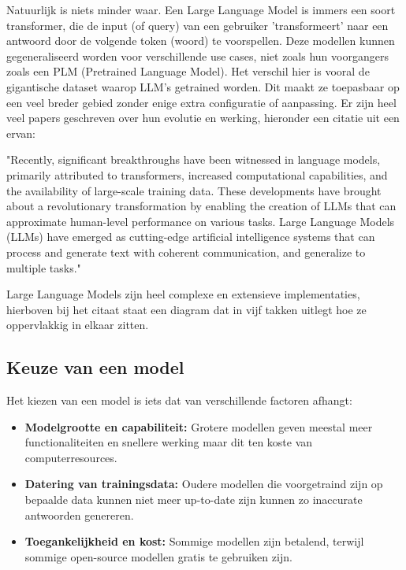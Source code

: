 Natuurlijk is niets minder waar.
Een Large Language Model is immers een soort transformer, die de input (of query) van een gebruiker 'transformeert' naar een antwoord door de volgende token (woord) te voorspellen.
Deze modellen kunnen gegeneraliseerd worden voor verschillende use cases, niet zoals hun voorgangers zoals een PLM (Pretrained Language Model).
Het verschil hier is vooral de gigantische dataset waarop LLM's getrained worden.
Dit maakt ze toepasbaar op een veel breder gebied zonder enige extra configuratie of aanpassing.
Er zijn heel veel papers geschreven over hun evolutie en werking, hieronder een citatie uit een ervan:

\begin{displayquote}
	"Recently, significant breakthroughs have been witnessed in language models, primarily attributed to transformers, increased computational capabilities, and the availability of large-scale training data.
	These developments have brought about a revolutionary transformation by enabling the creation of LLMs that can approximate human-level performance on various tasks.
	Large Language Models (LLMs) have emerged as cutting-edge artificial intelligence systems that can process and generate text with coherent communication, and generalize to multiple tasks."
	\begin{figure}[h]
		\centering
	\end{figure}
	\autocite{ACOoLLM}


\end{displayquote}

Large Language Models zijn heel complexe en extensieve implementaties, hierboven bij het citaat staat een diagram dat in vijf takken uitlegt hoe ze oppervlakkig in elkaar zitten.

\subsection{Keuze van een model}
Het kiezen van een model is iets dat van verschillende factoren afhangt:

\begin{itemize}
	\item \textbf{Modelgrootte en capabiliteit:} Grotere modellen geven meestal meer functionaliteiten en snellere werking maar dit ten koste van computerresources.
	\item \textbf{Datering van trainingsdata:} Oudere modellen die voorgetraind zijn op bepaalde data kunnen niet meer up-to-date zijn kunnen zo inaccurate antwoorden genereren.
	\item \textbf{Toegankelijkheid en kost:} Sommige modellen zijn betalend, terwijl sommige open-source modellen gratis te gebruiken zijn.
\end{itemize}

